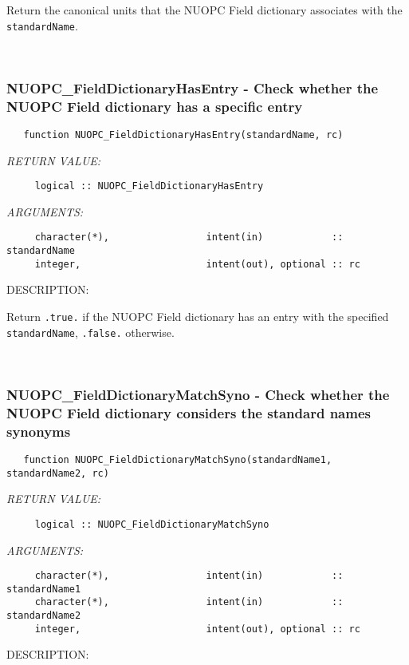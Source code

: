      Return the canonical units that the NUOPC Field dictionary associates with
     the {\tt standardName}. 
 
\mbox{}\hrulefill\ 
 
\subsubsection [NUOPC\_FieldDictionaryHasEntry] {NUOPC\_FieldDictionaryHasEntry - Check whether the NUOPC Field dictionary has a specific entry}


\begin{verbatim}   function NUOPC_FieldDictionaryHasEntry(standardName, rc)\end{verbatim}{\em RETURN VALUE:}
\begin{verbatim}     logical :: NUOPC_FieldDictionaryHasEntry\end{verbatim}{\em ARGUMENTS:}
\begin{verbatim}     character(*),                 intent(in)            :: standardName
     integer,                      intent(out), optional :: rc\end{verbatim}
{\sf DESCRIPTION:\\ }


     Return {\tt .true.} if the NUOPC Field dictionary has an entry with the
     specified {\tt standardName}, {\tt .false.} otherwise. 
 
\mbox{}\hrulefill\ 
 
\subsubsection [NUOPC\_FieldDictionaryMatchSyno] {NUOPC\_FieldDictionaryMatchSyno - Check whether the NUOPC Field dictionary considers the standard names synonyms}


\begin{verbatim}   function NUOPC_FieldDictionaryMatchSyno(standardName1, standardName2, rc)\end{verbatim}{\em RETURN VALUE:}
\begin{verbatim}     logical :: NUOPC_FieldDictionaryMatchSyno\end{verbatim}{\em ARGUMENTS:}
\begin{verbatim}     character(*),                 intent(in)            :: standardName1
     character(*),                 intent(in)            :: standardName2
     integer,                      intent(out), optional :: rc\end{verbatim}
{\sf DESCRIPTION:\\ }


